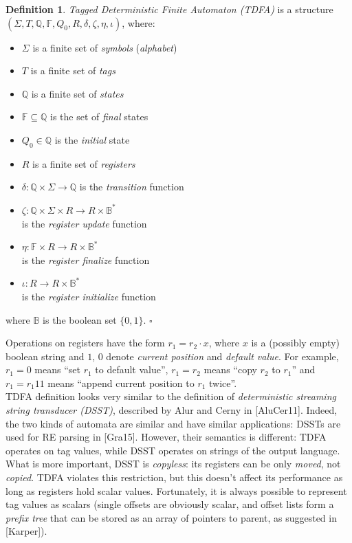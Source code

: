 \documentclass{article}
\newcommand{\Xeq}{\!=\!}
\newcommand{\YB}{\mathbb{B}}
\newcommand{\YF}{\mathbb{F}}
\newcommand{\YQ}{\mathbb{Q}}
\theoremstyle{definition}
\newtheorem{Xdef}{Definition}
\begin{document}
\begin{multicols}{2}
    \begin{Xdef}
    \emph{Tagged Deterministic Finite Automaton (TDFA)}
    is a structure $(\Sigma, T, \YQ, \YF, Q_0, R, \delta, \zeta, \eta, \iota)$, where:
    \begin{itemize}
    \setlength{\parskip}{0.5em}
        \item[] $\Sigma$ is a finite set of \emph{symbols} (\emph{alphabet})
        \item[] $T$ is a finite set of \emph{tags}
        \item[] $\YQ$ is a finite set of \emph{states}
        \item[] $\YF \subseteq \YQ$ is the set of \emph{final} states
        \item[] $Q_0 \in \YQ$ is the \emph{initial} state
        \item[] $R$ is a finite set of \emph{registers}
        \item[] $\delta: \YQ \times \Sigma \to \YQ$ is the \emph{transition} function
        \item[] $\zeta: \YQ \times \Sigma \times R \to R \times \YB^*$ \\
            is the \emph{register update} function
        \item[] $\eta: \YF \times R \to R \times \YB^*$ \\
            is the \emph{register finalize} function
        \item[] $\iota: R \to R \times \YB^*$ \\
            is the \emph{register initialize} function
    \end{itemize}
    where $\YB$ is the boolean set $\{0,1\}$.
    $\square$
    \end{Xdef}

Operations on registers have the form $r_1 \Xeq r_2 \cdot x$, where $x$ is a (possibly empty) boolean string
and $1$, $0$ denote \emph{current position} and \emph{default value}.
For example, $r_1 \Xeq 0$ means ``set $r_1$ to default value'',
$r_1 \Xeq r_2$ means ``copy $r_2$ to $r_1$'' and
$r_1 \Xeq r_1 1 1$ means ``append current position to $r_1$ twice''.
\\

TDFA definition looks very similar to the definition of
\emph{deterministic streaming string transducer (DSST)}, described by Alur and Cerny in [AluCer11].
Indeed, the two kinds of automata are similar and have similar applications: DSSTs are used for RE parsing in [Gra15].
However, their semantics is different: TDFA operates on tag values, while DSST operates on strings of the output language.
What is more important, DSST is \emph{copyless}:
its registers can be only \emph{moved}, not \emph{copied}.
TDFA violates this restriction, but this doesn't affect its performance as long as registers hold scalar values.
Fortunately, it is always possible to represent tag values as scalars
(single offsets are obviously scalar, and offset lists form a \emph{prefix tree} that can be stored as an array of pointers to parent,
as suggested in [Karper]).
\\


\end{multicols}
\end{document}
